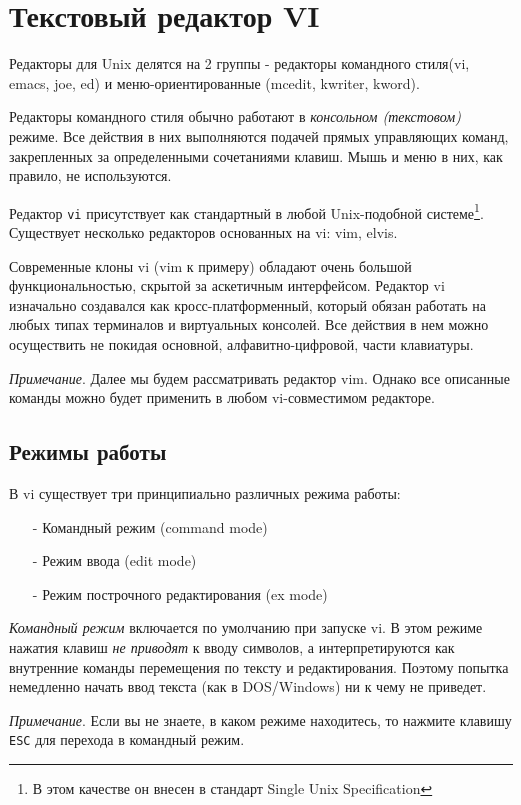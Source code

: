 \chapter{Текстовый редактор VI}

Редакторы для Unix делятся на 2 группы - редакторы командного стиля(vi, emacs, joe, ed) и меню-ориентированные (mcedit, kwriter, kword).

Редакторы командного стиля обычно работают в \emph{консольном (текстовом)} режиме. Все действия в них выполняются подачей прямых управляющих команд, закрепленных за определенными сочетаниями клавиш. Мышь и меню в них, как правило, не используются.

Редактор \verb+vi+ присутствует как стандартный в любой Unix-подобной системе\footnote{В этом качестве он внесен в стандарт Single Unix Specification}. Существует несколько редакторов основанных на vi: vim, elvis. 

Современные клоны vi (vim к примеру) обладают очень большой функциональностью, скрытой за аскетичным интерфейсом. Редактор vi изначально создавался как кросс-платформенный, который обязан работать на любых типах терминалов и виртуальных консолей. Все действия в нем можно осуществить не покидая основной, алфавитно-цифровой, части клавиатуры.

\emph{Примечание}. Далее мы будем рассматривать редактор vim. Однако все описанные команды можно будет применить в любом vi-совместимом редакторе.

\section{Режимы работы}

В vi существует три принципиально различных режима работы:
\begin{itemize}
\item [-] Командный режим (command mode)
\item [-] Режим ввода (edit mode)
\item [-] Режим построчного редактирования (ex mode)
\end{itemize}

\emph{Командный режим} включается по умолчанию при запуске vi. В этом режиме нажатия клавиш \emph{не приводят} к вводу символов, а интерпретируются как внутренние команды перемещения по тексту и редактирования. Поэтому попытка немедленно начать ввод текста (как в DOS/Windows) ни к чему не приведет.

\emph{Примечание}. Если вы не знаете, в каком режиме находитесь, то нажмите клавишу \verb+ESC+ для перехода в командный режим.

